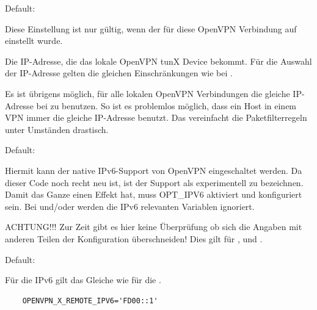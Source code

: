 \begin{description}

  Default: 

  Diese Einstellung ist nur gültig, wenn der
   für diese OpenVPN Verbindung
  auf  einstellt wurde.

  Die IP-Adresse, die das lokale OpenVPN tunX Device bekommt. Für die
  Auswahl der IP-Adresse gelten die gleichen Einschränkungen wie bei
  .

  Es ist übrigens möglich, für alle lokalen OpenVPN Verbindungen die
  gleiche IP-Adresse bei  zu
  benutzen. So ist es problemlos möglich, dass ein Host in einem VPN
  immer die gleiche IP-Adresse benutzt. Das vereinfacht die
  Paketfilterregeln unter Umständen drastisch.
  

  Default: 
  
  Hiermit kann der native IPv6-Support von OpenVPN eingeschaltet werden. Da dieser Code 
  noch recht neu ist, ist der Support als experimentell zu bezeichnen. Damit das Ganze einen 
  Effekt hat, muss OPT\_IPV6 aktiviert und konfiguriert sein. Bei 
  und/oder  werden die IPv6 relevanten Variablen ignoriert. 
  
  ACHTUNG!!! Zur Zeit gibt es hier keine Überprüfung ob sich die Angaben mit anderen Teilen 
  der Konfiguration überschneiden! Dies gilt für ,
   und .
  

  Default: 
  
  Für die IPv6 gilt das Gleiche wie für die .
  
  \begin{example}
  \begin{verbatim}
    OPENVPN_X_REMOTE_IPV6='FD00::1'
  \end{verbatim}
  \end{example}



\end{description}
